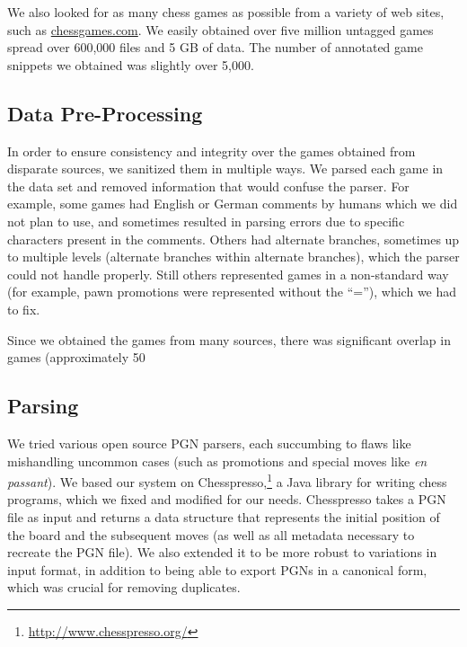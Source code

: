 \documentclass[11pt]{article}
\begin{document}
We also looked for as many chess games as possible from a variety of web sites, such as \url{chessgames.com}. We easily obtained over five million untagged games spread over 600,000 files and 5 GB of data. The number of annotated game snippets we obtained was slightly over 5,000.

\subsection{Data Pre-Processing}	
In order to ensure consistency and integrity over the games obtained from disparate sources, we sanitized them in multiple ways. We parsed each game in the data set and removed information that would confuse the parser. For example, some games had English or German comments by humans which we did not plan to use, and sometimes resulted in parsing errors due to specific characters present in the comments. Others had alternate branches, sometimes up to multiple levels (alternate branches within alternate branches), which the parser could not handle properly. Still others represented games in a non-standard way (for example, pawn promotions were represented without the ``=''), which we had to fix. 

Since we obtained the games from many sources, there was significant overlap in games (approximately 50%

\subsection{Parsing}
We tried various open source PGN parsers, each succumbing to flaws like mishandling uncommon cases (such as  promotions and special moves like \emph{en passant}). We based our system on Chesspresso,\footnote{\url{http://www.chesspresso.org/}} a Java library for writing chess programs, which we fixed and modified for our needs. Chesspresso takes a PGN file as input and returns a data structure that represents the initial position of the board and the subsequent moves (as well as all metadata necessary to recreate the PGN file). We also extended it to be more robust to variations in input format, in addition to being able to export PGNs in a canonical form, which was crucial for removing duplicates.
\end{document}
